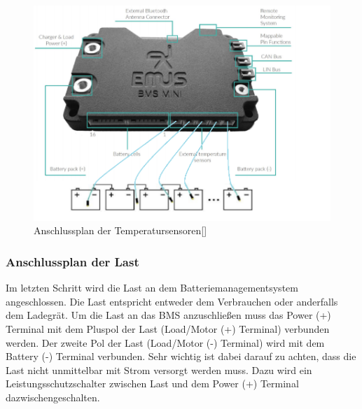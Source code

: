\begin{figure}[H]
	\begin{center}
		\includegraphics[scale=0.7]{figures/Akku/SystemStrukturBMSTemperatur.png}
		\caption{Anschlussplan der Temperatursensoren[\cite{AnschlussplanTemp}]}
		\label{fig: Anschlussplan der Temperatursensoren}
	\end{center}
\end{figure}
\newpage

\subsubsection{Anschlussplan der Last}

Im letzten Schritt wird die Last an dem Batteriemanagementsystem angeschlossen. Die Last entspricht entweder dem Verbrauchen oder anderfalls dem Ladegrät. Um die Last an das BMS anzuschließen muss das Power (+) Terminal mit dem Pluspol der Last (Load/Motor (+) Terminal) verbunden werden. Der zweite Pol der Last (Load/Motor (-) Terminal) wird mit dem Battery (-) Terminal verbunden. Sehr wichtig ist dabei darauf zu achten, dass die Last nicht unmittelbar mit Strom versorgt werden muss. Dazu wird ein Leistungsschutzschalter zwischen Last und dem Power (+) Terminal dazwischengeschalten.

